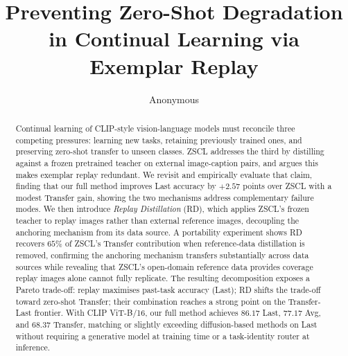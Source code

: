 \documentclass{article}
\title{Preventing Zero-Shot Degradation in Continual Learning via Exemplar Replay}
\author{Anonymous}
\begin{document}
  \maketitle

\newif\ifhighlight

\highlighttrue  %

\newcommand{\fzq}[2]{%
    \ifhighlight
        \textcolor{blue}{#2} (\textbf{\textcolor{red}{fzq}:} \textit{\textcolor{red}{#1}})%
    \else
        #2%
    \fi
}

  \begin{abstract}
  Continual learning of CLIP-style vision-language models must reconcile three
  competing pressures: learning new tasks, retaining previously trained ones, and
  preserving zero-shot transfer to unseen classes. ZSCL addresses the third by
  distilling against a frozen pretrained teacher on external image-caption pairs,
  and argues this makes exemplar replay redundant. We revisit and empirically
  evaluate that claim, finding that our full method improves Last accuracy by
  $+2.57$ points over ZSCL with a modest Transfer gain, showing the two mechanisms
  address complementary failure modes. We then introduce \emph{Replay Distillation}
  (RD), which applies ZSCL's frozen teacher to replay images rather than external
  reference images, decoupling the anchoring mechanism from its data source. A
  portability experiment shows RD recovers $65\%$ of ZSCL's Transfer contribution
  when reference-data distillation is removed, confirming the anchoring mechanism
  transfers substantially across data sources while revealing that ZSCL's
  open-domain reference data provides coverage replay images alone cannot fully
  replicate. The resulting decomposition exposes a Pareto trade-off: replay
  maximises past-task accuracy (Last); RD shifts the trade-off toward zero-shot
  Transfer; their combination reaches a strong point on the Transfer-Last frontier.
  With CLIP ViT-B/16, our full method achieves $86.17$ Last, $77.17$ Avg, and
  $68.37$ Transfer, matching or slightly exceeding diffusion-based methods on Last
  without requiring a generative model at training time or a task-identity router
  at inference.
  \end{abstract}
\end{document}
